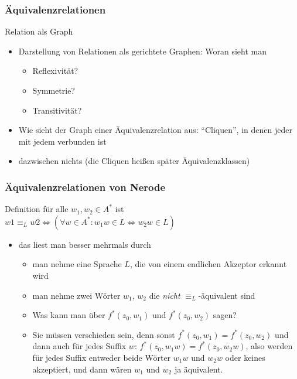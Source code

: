 \begin{frame}
  \frametitle{Äquivalenzrelationen}

  \begin{block}{Relation als Graph}
    \begin{itemize}
    \item Darstellung von Relationen als gerichtete Graphen:
      Woran sieht man
      \begin{itemize}
        \item Reflexivität?
        \item Symmetrie?
        \item Transitivität?
      \end{itemize} \pause
    \item Wie sieht der Graph einer Äquivalenzrelation aus: \pause
      "`Cliquen"', in denen jeder mit jedem verbunden ist
      \item dazwischen nichts (die Cliquen heißen später Äquivalenzklassen)
    \end{itemize}
   \end{block}
\end{frame}


\begin{frame}
  \frametitle{Äquivalenzrelationen von Nerode}

  \begin{block}{Definition}
  	für alle $w_1,w_2 \in A^*$ ist\\
  	$w1 \equiv_L w2 \Leftrightarrow (\forall w \in A^*: w_1w \in L \Leftrightarrow w_2w \in L)$

  	\pause
    \begin{itemize}
    \item das liest man besser mehrmals durch
    	\pause
      \begin{itemize}
      \item man nehme eine Sprache $L$, die von einem endlichen Akzeptor
        erkannt wird
      \item man nehme zwei Wörter $w_1$, $w_2$ die \emph{nicht}
        $\equiv_L$-äquivalent sind
      \item Was kann man über $f^*(z_0,w_1)$ und $f^*(z_0,w_2)$ sagen?\pause
      \item Sie müssen verschieden sein, denn sonst
        $f^*(z_0,w_1)=f^*(z_0,w_2)$ und dann auch für jedes Suffix
        $w$: $f^*(z_0,w_1w)=f^*(z_0,w_2w)$, also werden für jedes
        Suffix entweder beide Wörter $w_1w$ und $w_2w$ oder keines
        akzeptiert, und dann wären $w_1$ und $w_2$ ja äquivalent.
      \end{itemize}
    \end{itemize}

   \end{block}
\end{frame}


